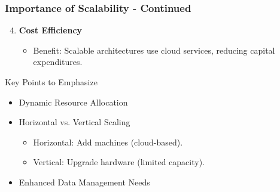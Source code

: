\documentclass[aspectratio=169]{beamer}
\begin{document}
\begin{frame}[fragile]
    \frametitle{Importance of Scalability - Continued}
    \begin{enumerate}
        \setcounter{enumi}{3} %
        \item \textbf{Cost Efficiency}
        \begin{itemize}
            \item Benefit: Scalable architectures use cloud services, reducing capital expenditures.
        \end{itemize}
    \end{enumerate}
    
    \begin{block}{Key Points to Emphasize}
        \begin{itemize}
            \item Dynamic Resource Allocation
            \item Horizontal vs. Vertical Scaling
            \begin{itemize}
                \item Horizontal: Add machines (cloud-based).
                \item Vertical: Upgrade hardware (limited capacity).
            \end{itemize}
            \item Enhanced Data Management Needs
        \end{itemize}
    \end{block}
\end{frame}
\end{document}
